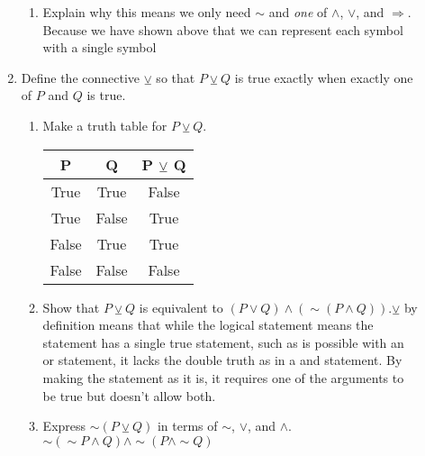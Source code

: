 \documentclass{letter}
\begin{document}
\begin{description}
\begin{enumerate}
\begin{enumerate}
				\item Explain why this means we only need $\sim$ and {\em one} of $\wedge$, $\vee$, and $\Rightarrow$. \\
                                   Because we have shown above that we can represent each symbol with a single symbol
			\end{enumerate}
	\item Define the connective $\veebar$ so that $P\veebar Q$ is true exactly when exactly one of $P$ and $Q$ is true.
			\begin{enumerate}\itemsep=1.25mm
				\item Make a truth table for $P\veebar Q$.
                                  \begin{center}
                                    \begin{tabular}{||c|c|c||}
                                    \hline
                                    P & Q & P $\veebar$ Q \\ \hline
                                    True & True & False \\ \hline
                                    True & False & True \\ \hline
                                    False & True & True \\ \hline
                                    False & False & False \\ 
                                    \hline
                                    \end{tabular}
                                    \end{center}


                                    
                                    
                                    
				\item Show that $P\veebar Q$ is equivalent to $(P\vee Q)\wedge (\sim (P\wedge Q))$.$\veebar$ by definition means that while the logical statement means the statement has a single true statement, such as is possible with an or statement, it lacks the double truth as in a and statement. By making the statement as it is, it requires one of the arguments to be true but doesn't allow both.
				\item Express $\sim (P\veebar Q)$ in terms of $\sim$, $\vee$, and $\wedge$. \\
                                  $\sim(\sim P \wedge Q) \wedge \sim (P \wedge \sim Q)$
 

\end{enumerate}
\end{enumerate}
\end{description}
\end{document}

